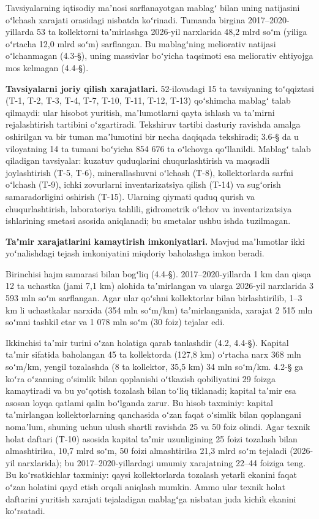 
Tavsiyalarning iqtisodiy maʼnosi sarflanayotgan mablagʻ bilan uning
natijasini oʻlchash xarajati orasidagi nisbatda koʻrinadi. Tumanda
birgina 2017--2020-yillarda 53 ta kollektorni taʼmirlashga 2026-yil
narxlarida 48,2 mlrd soʻm (yiliga oʻrtacha 12,0 mlrd soʻm) sarflangan.
Bu mablagʻning meliorativ natijasi oʻlchanmagan (4.3-§), uning massivlar
boʻyicha taqsimoti esa meliorativ ehtiyojga mos kelmagan (4.4-§).

\textbf{Tavsiyalarni joriy qilish xarajatlari.} 52-ilovadagi 15 ta
tavsiyaning toʻqqiztasi (T-1, T-2, T-3, T-4, T-7, T-10, T-11, T-12,
T-13) qoʻshimcha mablagʻ talab qilmaydi: ular hisobot yuritish,
maʼlumotlarni qayta ishlash va taʼmirni rejalashtirish tartibini
oʻzgartiradi. Tekshiruv tartibi dasturiy ravishda amalga oshirilgan va
bir tuman maʼlumotini bir necha daqiqada tekshiradi; 3.6-§ da u
viloyatning 14 ta tumani boʻyicha 854 676 ta oʻlchovga qoʻllanildi.
Mablagʻ talab qiladigan tavsiyalar: kuzatuv quduqlarini chuqurlashtirish
va maqsadli joylashtirish (T-5, T-6), minerallashuvni oʻlchash (T-8),
kollektorlarda sarfni oʻlchash (T-9), ichki zovurlarni inventarizatsiya
qilish (T-14) va sugʻorish samaradorligini oshirish (T-15). Ularning
qiymati quduq qurish va chuqurlashtirish, laboratoriya tahlili,
gidrometrik oʻlchov va inventarizatsiya ishlarining smetasi asosida
aniqlanadi; bu smetalar ushbu ishda tuzilmagan.

\textbf{Taʼmir xarajatlarini kamaytirish imkoniyatlari.} Mavjud
maʼlumotlar ikki yoʻnalishdagi tejash imkoniyatini miqdoriy baholashga
imkon beradi.

Birinchisi hajm samarasi bilan bogʻliq (4.4-§). 2017--2020-yillarda 1 km
dan qisqa 12 ta uchastka (jami 7,1 km) alohida taʼmirlangan va ularga
2026-yil narxlarida 3 593 mln soʻm sarflangan. Agar ular qoʻshni
kollektorlar bilan birlashtirilib, 1--3 km li uchastkalar narxida (354
mln soʻm/km) taʼmirlanganida, xarajat 2 515 mln soʻmni tashkil etar va 1
078 mln soʻm (30 foiz) tejalar edi.

Ikkinchisi taʼmir turini oʻzan holatiga qarab tanlashdir (4.2, 4.4-§).
Kapital taʼmir sifatida baholangan 45 ta kollektorda (127,8 km) oʻrtacha
narx 368 mln soʻm/km, yengil tozalashda (8 ta kollektor, 35,5 km) 34 mln
soʻm/km. 4.2-§ ga koʻra oʻzanning oʻsimlik bilan qoplanishi oʻtkazish
qobiliyatini 29 foizga kamaytiradi va bu yoʻqotish tozalash bilan toʻliq
tiklanadi; kapital taʼmir esa asosan loyqa qatlami qalin boʻlganda
zarur. Bu hisob taxminiy: kapital taʼmirlangan kollektorlarning
qanchasida oʻzan faqat oʻsimlik bilan qoplangani nomaʼlum, shuning uchun
ulush shartli ravishda 25 va 50 foiz olindi. Agar texnik holat daftari
(T-10) asosida kapital taʼmir uzunligining 25 foizi tozalash bilan
almashtirilsa, 10,7 mlrd soʻm, 50 foizi almashtirilsa 21,3 mlrd soʻm
tejaladi (2026-yil narxlarida); bu 2017--2020-yillardagi umumiy
xarajatning 22--44 foiziga teng. Bu koʻrsatkichlar taxminiy: qaysi
kollektorlarda tozalash yetarli ekanini faqat oʻzan holatini qayd etish
orqali aniqlash mumkin. Ammo ular texnik holat daftarini yuritish
xarajati tejaladigan mablagʻga nisbatan juda kichik ekanini koʻrsatadi.

